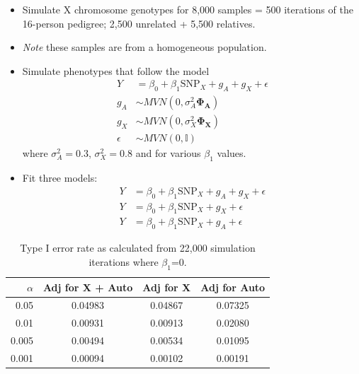 \documentclass{beamer}
\begin{document}
\begin{frame}%
\small
\begin{itemize}
\item Simulate X chromosome genotypes for 8,000 samples = 500 iterations of the 16-person pedigree; 2,500 unrelated + 5,500 relatives.
\item \textit{Note} these samples are from a homogeneous population.
\item Simulate phenotypes that follow the model 
\begin{align*}
Y &= \beta_0 + \beta_1 \mbox{SNP}_X + g_A + g_X  +\epsilon\\
g_A &\sim MVN(0,\sigma^2_A \mathbf{\Phi_A}) \\
g_X &\sim MVN(0, \sigma^2_X \mathbf{\Phi_X}) \\
\epsilon &\sim MVN(0, \mathbb{I})
\end{align*}where $\sigma^2_A=0.3$, $\sigma^2_X=0.8$ and for various $\beta_1$ values.
\item Fit three models:
\begin{align*}
 Y &= \beta_0 + \beta_1 \mbox{SNP}_X + g_A + g_X +\epsilon\\
Y &= \beta_0 + \beta_1 \mbox{SNP}_X + g_X + \epsilon\\
Y &= \beta_0 + \beta_1 \mbox{SNP}_X  + g_A + \epsilon
\end{align*}
\end{itemize}
\end{frame}

\begin{frame}%
\begin{table}[ht]
\centering
\begin{tabular}{r|ccc}
  \hline
 $\alpha$ & Adj for X + Auto& Adj for X & Adj for Auto \\ 
  \hline
 0.05 & 0.04983 & 0.04867 & 0.07325 \\ 
 0.01 & 0.00931 & 0.00913 & 0.02080 \\ 
 0.005 & 0.00494 & 0.00534 & 0.01095 \\ 
 0.001 & 0.00094 & 0.00102 & 0.00191 \\ 
   \hline
\end{tabular}
\caption{Type I error rate as calculated from 22,000 simulation iterations where $\beta_1$=0.}
\end{table}
\end{frame}
\end{document}
